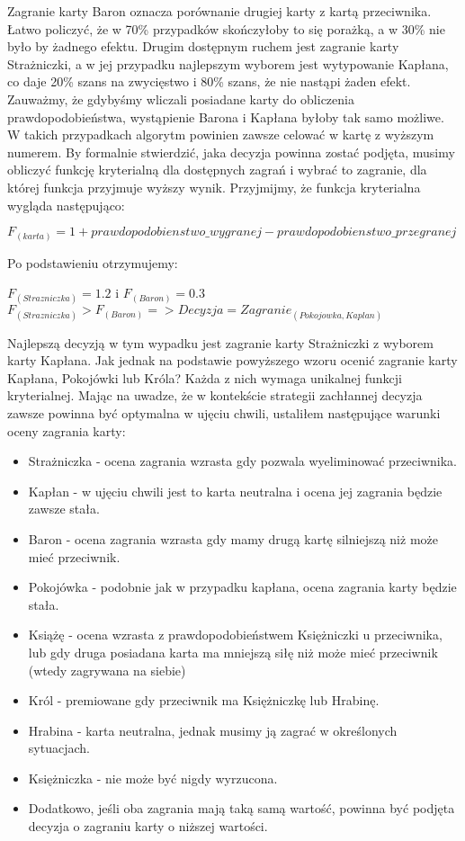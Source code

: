 Zagranie karty Baron oznacza porównanie drugiej karty z kartą przeciwnika. Łatwo policzyć, że w 70\% przypadków skończyłoby to się porażką, a w 30\% nie było by żadnego efektu. Drugim dostępnym ruchem jest zagranie karty Strażniczki, a w jej przypadku najlepszym wyborem jest wytypowanie Kapłana, co daje 20\% szans na zwycięstwo i 80\% szans, że nie nastąpi żaden efekt. Zauważmy, że gdybyśmy wliczali posiadane karty do obliczenia prawdopodobieństwa, wystąpienie Barona i Kapłana byłoby tak samo możliwe. W takich przypadkach algorytm powinien zawsze celować w kartę z wyższym numerem. By formalnie stwierdzić, jaka decyzja powinna zostać podjęta, musimy obliczyć funkcję kryterialną dla dostępnych zagrań i wybrać to zagranie, dla której funkcja przyjmuje wyższy wynik. Przyjmijmy, że funkcja kryterialna wygląda następująco:

\begin{center}
	$F_{(karta)} = 1 + prawdopodobienstwo\_wygranej - prawdopodobienstwo\_przegranej$
\end{center}
Po podstawieniu otrzymujemy:
\begin{center}
 $F_{(Strazniczka)}=1.2$ i $F_{(Baron)} = 0.3$
 \\
 $F_{(Strazniczka)}>F_{(Baron)} => Decyzja=Zagranie_{(Pokojowka, Kaplan)}$ 
 \end{center} 

Najlepszą decyzją w tym wypadku jest zagranie karty Strażniczki z wyborem karty Kapłana. Jak jednak na podstawie powyższego wzoru ocenić zagranie karty Kapłana, Pokojówki lub Króla? Każda z nich wymaga unikalnej funkcji kryterialnej. Mając na uwadze, że w kontekście strategii zachłannej decyzja zawsze powinna być optymalna w ujęciu chwili, ustaliłem następujące warunki oceny zagrania karty:
\begin{itemize}
	\item Strażniczka - ocena zagrania wzrasta gdy pozwala wyeliminować przeciwnika.
	\item Kapłan - w ujęciu chwili jest to karta neutralna i ocena jej zagrania będzie zawsze stała.
	\item Baron - ocena zagrania wzrasta gdy mamy drugą kartę silniejszą niż może mieć przeciwnik.
	\item Pokojówka - podobnie jak w przypadku kapłana, ocena zagrania karty będzie stała.
	\item Książę - ocena wzrasta z prawdopodobieństwem Księżniczki u przeciwnika, lub gdy druga posiadana karta ma mniejszą siłę niż może mieć przeciwnik (wtedy zagrywana na siebie)
	\item Król - premiowane gdy przeciwnik ma Księżniczkę lub Hrabinę.
	\item Hrabina - karta neutralna, jednak musimy ją zagrać w określonych sytuacjach.
	\item Księżniczka - nie może być nigdy wyrzucona.
	\item Dodatkowo, jeśli oba zagrania mają taką samą wartość, powinna być podjęta decyzja o zagraniu karty o niższej wartości.
\end{itemize}

